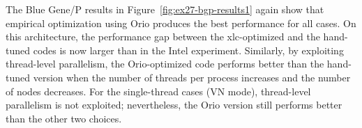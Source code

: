 The Blue Gene/P results in Figure~\ref{fig:ex27-bgp-results1} again show
that empirical optimization using Orio produces the best performance for
all cases. 
On this architecture, the performance gap between the xlc-optimized and the
hand-tuned codes is now larger than in the Intel experiment. Similarly, by
exploiting thread-level parallelism, the Orio-optimized code performs better
than the hand-tuned version when the number of threads per process increases
and the number of nodes decreases. For the single-thread cases (VN mode),
thread-level parallelism is not exploited; nevertheless, the Orio version
still performs better than the other two choices.

